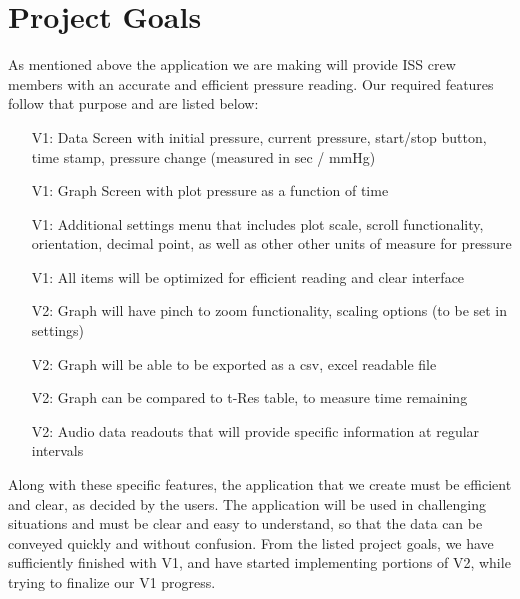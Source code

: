 \documentclass[onecolumn, draftclsnofoot,10pt, compsoc]{IEEEtran}
\begin{document}
\section{Project Goals}
As mentioned above the application we are making will provide ISS crew members with an accurate and efficient pressure reading.
Our required features follow that purpose and are listed below:
\begin{itemize}
\item[V1:] Data Screen with initial pressure, current pressure, start/stop button, time stamp, pressure change (measured in sec / mmHg)
\item[V1:] Graph Screen with plot pressure as a function of time
\item[V1:] Additional settings menu that includes plot scale, scroll functionality, orientation, decimal point, as well as other other units of measure for pressure
\item[V1:] All items will be optimized for efficient reading and clear interface
\item[V2:] Graph will have pinch to zoom functionality, scaling options (to be set in settings)
\item[V2:] Graph will be able to be exported as a csv, excel readable file
\item[V2:] Graph can be compared to t-Res table, to measure time remaining
\item[V2:] Audio data readouts that will provide specific information at regular intervals
\end{itemize}

Along with these specific features, the application that we create must be efficient and clear, as decided by the users.
The application will be used in challenging situations and must be clear and easy to understand, so that the data can be conveyed quickly and without confusion.
From the listed project goals, we have sufficiently finished with V1, and have started implementing portions of V2, while trying to finalize our V1 progress.


\end{document}
